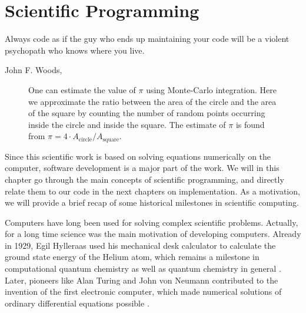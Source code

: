 \chapter{Scientific Programming} \label{chp:scientificprogramming}
\epigraph{Always code as if the guy who ends up maintaining your code will be a violent psychopath who knows where you live.}{John F. Woods, \cite{woods_usage_nodate}}
\begin{figure}[H]
	\centering
	\caption{One can estimate the value of $\pi$ using Monte-Carlo integration. Here we approximate the ratio between the area of the circle and the area of the square by counting the number of random points occurring inside the circle and inside the square. The estimate of $\pi$ is found from $\pi=4\cdot A_{\text{circle}}/A_{\text{square}}$.}
	\label{fig:montecarlointegration}
\end{figure}

Since this scientific work is based on solving equations numerically on the computer, software development is a major part of the work. We will in this chapter go through the main concepts of scientific programming, and directly relate them to our code in the next chapters on implementation. As a motivation, we will provide a brief recap of some historical milestones in scientific computing.

Computers have long been used for solving complex scientific problems. Actually, for a long time science was the main motivation of developing computers. Already in 1929, Egil Hylleraas used his mechanical desk calculator to calculate the ground state energy of the Helium atom, which remains a milestone in computational quantum chemistry as well as quantum chemistry in general \cite{helgaker_perspective_2000}. Later, pioneers like Alan Turing and John von Neumann contributed to the invention of the first electronic computer, which made numerical solutions of ordinary differential equations possible \cite{gustafsson_scientific_2018}. 

